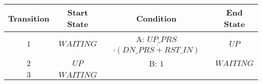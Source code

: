 \documentclass[11pt]{article}
\begin{document}
\begin{longtable}[]{@{}cccc@{}}
\toprule
\begin{minipage}[b]{0.07\columnwidth}\centering\strut
Transition\strut
\end{minipage} & \begin{minipage}[b]{0.07\columnwidth}\centering\strut
Start State\strut
\end{minipage} & \begin{minipage}[b]{0.07\columnwidth}\centering\strut
Condition\strut
\end{minipage} & \begin{minipage}[b]{0.07\columnwidth}\centering\strut
End State\strut
\end{minipage}\tabularnewline
\midrule
\endhead
\begin{minipage}[t]{0.07\columnwidth}\centering\strut
\(1\)\strut
\end{minipage} & \begin{minipage}[t]{0.07\columnwidth}\centering\strut
\(WAITING\)\strut
\end{minipage} & \begin{minipage}[t]{0.07\columnwidth}\centering\strut
A: \(UP\_PRS\) \(\cdot\overline{(DN\_PRS+ RST\_IN)}\)\strut
\end{minipage} & \begin{minipage}[t]{0.07\columnwidth}\centering\strut
\(UP\)\strut
\end{minipage}\tabularnewline
\begin{minipage}[t]{0.07\columnwidth}\centering\strut
\(2\)\strut
\end{minipage} & \begin{minipage}[t]{0.07\columnwidth}\centering\strut
\(UP\)\strut
\end{minipage} & \begin{minipage}[t]{0.07\columnwidth}\centering\strut
B: \(1\)\strut
\end{minipage} & \begin{minipage}[t]{0.07\columnwidth}\centering\strut
\(WAITING\)\strut
\end{minipage}\tabularnewline
\begin{minipage}[t]{0.07\columnwidth}\centering\strut
\(3\)\strut
\end{minipage} & \begin{minipage}[t]{0.07\columnwidth}\centering\strut
\(WAITING\)\strut
\end{minipage} & \begin{minipage}[t]{0.07\columnwidth}\centering\strut

\end{minipage}
\end{longtable}
\end{document}

